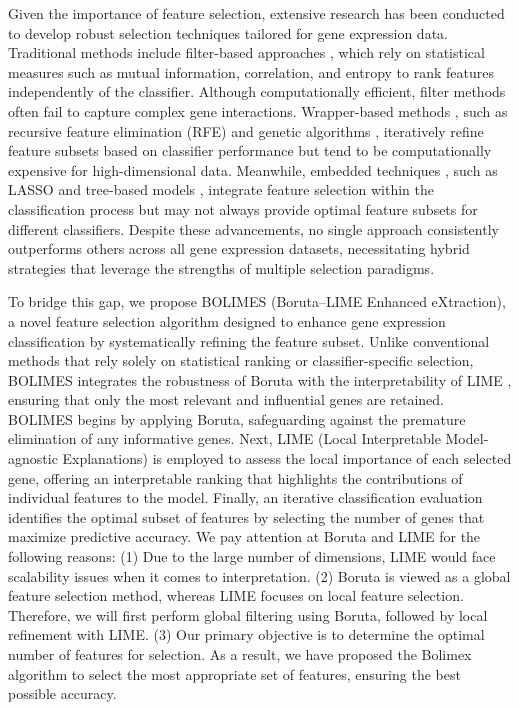 Given the importance of feature selection, extensive research has been conducted to develop robust selection techniques tailored for gene expression data. Traditional methods include filter-based approaches \cite{duch2006filter,cervante2012binary,cherrington2019feature,lee2011filter}, which rely on statistical measures such as mutual information, correlation, and entropy to rank features independently of the classifier. Although computationally efficient, filter methods often fail to capture complex gene interactions. Wrapper-based methods \cite{bajer2020wrapper,wang2014stability,kasongo2020deep,mufassirin2018novel}, such as recursive feature elimination (RFE) \cite{chen2007enhanced,yan2015feature} and genetic algorithms \cite{leardi1992genetic}, iteratively refine feature subsets based on classifier performance but tend to be computationally expensive for high-dimensional data. Meanwhile, embedded techniques \cite{imani2013novel,stanczyk2015feature,hamed2014accurate}, such as LASSO \cite{fonti2017feature,muthukrishnan2016lasso} and tree-based models \cite{freeman2013feature,liu2019embedded}, integrate feature selection within the classification process but may not always provide optimal feature subsets for different classifiers. Despite these advancements, no single approach consistently outperforms others across all gene expression datasets, necessitating hybrid strategies that leverage the strengths of multiple selection paradigms.

To bridge this gap, we propose BOLIMES (Boruta–LIME Enhanced eXtraction), a novel feature selection algorithm designed to enhance gene expression classification by systematically refining the feature subset. Unlike conventional methods that rely solely on statistical ranking or classifier-specific selection, BOLIMES integrates the robustness of Boruta \cite{kursa2010boruta,zhou2023diabetes} with the interpretability of LIME \cite{ribeiro2016should}, ensuring that only the most relevant and influential genes are retained. BOLIMES begins by applying Boruta, safeguarding against the premature elimination of any informative genes. Next, LIME (Local Interpretable Model-agnostic Explanations) \cite{ribeiro2016should,kumarakulasinghe2020evaluating} is employed to assess the local importance of each selected gene, offering an interpretable ranking that highlights the contributions of individual features to the model. Finally, an iterative classification evaluation identifies the optimal subset of features by selecting the number of genes that maximize predictive accuracy. We pay attention at Boruta and LIME for the following reasons: (1) Due to the large number of dimensions, LIME would face scalability issues when it comes to interpretation. (2) Boruta is viewed as a global feature selection method, whereas LIME focuses on local feature selection. Therefore, we will first perform global filtering using Boruta, followed by local refinement with LIME. (3) Our primary objective is to determine the optimal number of features for selection. As a result, we have proposed the Bolimex algorithm to select the most appropriate set of features, ensuring the best possible accuracy.








